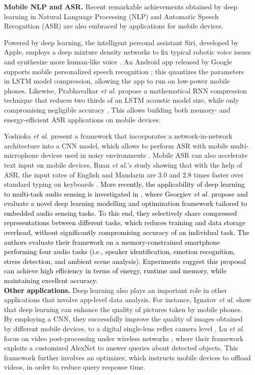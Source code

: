 \documentclass[journal,comsoc,letter]{IEEEtran}
\newcommand{\edit}[1]{\textcolor{black}{#1}}
\begin{document}
\noindent\textbf{Mobile NLP and ASR.}
Recent remarkable achievements obtained by deep learning in Natural Language Processing (NLP) and Automatic Speech Recognition (ASR) are also embraced by applications for mobile devices. 



Powered by deep learning, the intelligent personal assistant Siri, developed by Apple, employs a deep mixture density networks \cite{zen2014deep} to fix typical robotic voice issues and synthesize more human-like voice \cite{siri}. An Android app released by Google supports mobile personalized speech recognition \cite{mcgraw2016personalized}; this quantizes the parameters in LSTM model compression, allowing the app to run on low-power mobile phones. Likewise, Prabhavalkar \emph{et al.} propose a mathematical RNN compression technique that reduces two thirds of an LSTM acoustic model size, while only compromising negligible accuracy \cite{prabhavalkar2016compression}. This allows building both memory- and energy-efficient ASR applications on mobile devices.

Yoshioka \emph{et al.} present a framework that incorporates a network-in-network architecture into a CNN model, which allows to perform ASR with mobile multi-microphone devices used in noisy environments \cite{yoshioka2015ntt}. Mobile ASR can also accelerate text input on mobile devices, Ruan \emph{et al.}'s study showing that with the help of ASR, the input rates of English and Mandarin are 3.0 and 2.8 times faster over standard typing on keyboards \cite{ruan2016speech}. 
\edit{More recently, the applicability of deep learning to multi-task audio sensing is investigated in \cite{georgiev2017low}, where Georgiev \emph{et al.} propose and evaluate a novel deep learning modelling and optimization framework tailored to embedded audio sensing tasks. To this end, they selectively share compressed representations between different tasks, which reduces training and data storage overhead, without significantly compromising accuracy of an individual task. The authors evaluate their framework on a memory-constrained smartphone performing four audio tasks (i.e., speaker identification, emotion recognition, stress detection, and ambient scene analysis). Experiments suggest this proposal can achieve high efficiency in terms of energy, runtime and memory, while maintaining excellent accuracy.}\\



\noindent\edit{\textbf{Other applications.}} Deep learning also plays an important role in other applications that involve app-level data analysis. For instance, Ignatov \emph{et al.} show that deep learning can enhance the quality of pictures taken by mobile phones. By employing a CNN, they successfully improve the quality of images obtained by different mobile devices, to a digital single-lens reflex camera level \cite{ignatov2017dslr}. Lu \emph{et al.} focus on video post-processing under wireless networks \cite{lu2017demo}, where their framework exploits a customized AlexNet to answer queries about detected objects. This framework further involves an optimizer, which instructs mobile devices to offload videos, in order to reduce query response time. 
\end{document}
